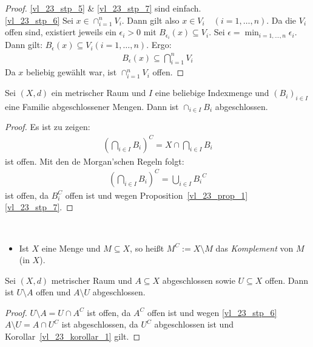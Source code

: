 \begin{proof}
\ref{vl_23_stp_5} \& \ref{vl_23_stp_7} sind einfach. \\
\ref{vl_23_stp_6} Sei $x \in \cap_{i=1}^n V_i$. Dann gilt also $x \in V_i \quad (
	i = 1, \hdots, n)$. Da die $V_i$ offen sind, existiert jeweils ein $\epsilon_i 
	> 0$ mit $B_{\epsilon_i} (x) \subseteq V_i$. 
	Sei $\epsilon = \min_{i = 1, \hdots, n} \epsilon_i$. Dann gilt: 
	$B_\epsilon(x) \subseteq V_i (i = 1, \hdots, n)$. Ergo:
	\begin{align*}
		B_\epsilon(x) \subseteq \bigcap_{i = 1}^n V_i
	\end{align*}
	Da $x$ beliebig gewählt war, ist $\cap_{i = 1}^n V_i$ offen.
\end{proof}

\begin{Korollar}{\label{vl_23_korollar_1}%
	Sei $(X,d)$ ein metrischer Raum und $I$ eine beliebige Indexmenge und $(B_i)_{
	i \in I}$ eine Familie abgeschlossener Mengen. Dann ist $\cap_{i \in I} B_i$ 
	abgeschlossen.
}\end{Korollar}

\begin{proof}
	Es ist zu zeigen: 
	\begin{align*}
		\left( \bigcap_{i \in I} B_i \right)^C = X \cap \bigcap_{i \in I} B_i
	\end{align*}
	ist offen. Mit den de Morgan'schen Regeln folgt:
	\begin{align*}
		\left( \bigcap_{i \in I} B_i \right)^C = \bigcup_{i \in I}{B_i}^C
	\end{align*}
	ist offen, da $B_i^C$ offen ist und wegen Proposition~\ref{vl_23_prop_1}~	
	\ref{vl_23_stp_7}.
\end{proof}

\begin{Bemerkung}{
	~\begin{itemize}
		\item Ist $X$ eine Menge und $M \subseteq X$, so heißt 
		$M^C := X \setminus M$ das \emph{Komplement} von $M$ (in $X$).
	\end{itemize}
}\end{Bemerkung}

\begin{Korollar}{%
	Sei $(X,d)$ metrischer Raum und $A \subseteq X$ abgeschlossen sowie $U 
	\subseteq X$ offen. Dann ist $U \setminus A$ offen und $A \setminus U$ abgeschlossen.
}\end{Korollar}

\begin{proof}
	$U \setminus A = U \cap A^C$ ist offen, da $A^C$ offen ist und wegen \ref{vl_23_stp_6}
	$A \setminus U = A \cap U^C$ ist abgeschlossen, da $U^C$ abgeschlossen ist und 
	Korollar~\ref{vl_23_korollar_1} gilt.
\end{proof}

